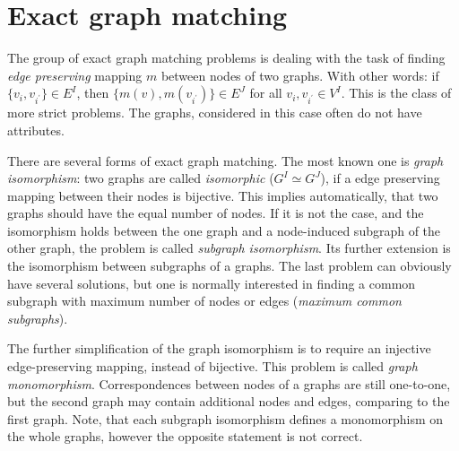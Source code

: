 \section{Exact graph matching}
The group of exact graph matching problems is dealing with the task of finding \emph{edge preserving} mapping $m$ between nodes of two graphs. With other words: if $\{v_i,v_{i^\prime}\}\in E^I$, then $\{m(v),m(v_{i^\prime})\}\in E^J$ for all $v_i,v_{i^\prime}\in V^I$. This is the class of more strict problems. The graphs, considered in this case often do not have attributes.

There are several forms of exact graph matching. The most known one is \emph{graph isomorphism}: two graphs are called \emph{isomorphic} ($G^I\simeq G^J$), if a edge preserving mapping between their nodes is bijective. This implies automatically, that two graphs should have the equal number of nodes. If it is not the case, and the isomorphism holds between the one graph and a node-induced subgraph of the other graph, the problem is called \emph{subgraph isomorphism}. Its further extension is the isomorphism between subgraphs of a graphs. The last problem can obviously have several solutions, but one is normally interested in finding a common subgraph with maximum number of nodes or edges (\emph{maximum common subgraphs}).  

The further simplification of the graph isomorphism is to require an injective edge-preserving mapping, instead of bijective. This problem is called \emph{graph monomorphism}. Correspondences between nodes of a graphs are still one-to-one, but the second graph may contain additional nodes and edges, comparing to the first graph. Note, that each subgraph isomorphism defines a monomorphism on the whole graphs, however the opposite statement is not correct.

